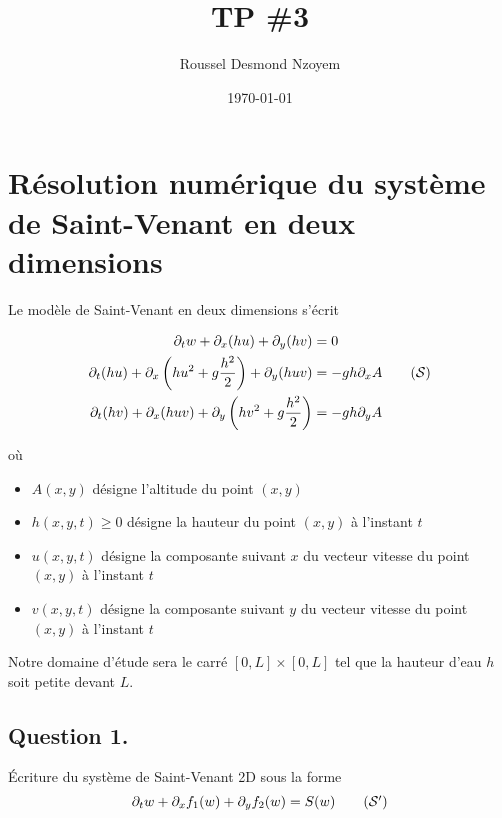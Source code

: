 \documentclass[
	french,
	11pt, %
]{fphw}
\title{TP \#3} %
\author{Roussel Desmond Nzoyem} %
\date{\today} %
\institute{Université de Strasbourg \\ UFR de Mathématiques et Informatique} %
\begin{document}
\maketitle %



\section*{Résolution numérique du système de Saint-Venant en deux dimensions}

Le modèle de Saint-Venant en deux dimensions s'écrit 

\begin{align*}
	\partial_t w + \partial_x (hu) + \partial_y(hv)  &=0 \\
	\partial_t(hu) + \partial_x \left(hu^2 + g\frac{h^2}{2} \right) + \partial_y(huv) &= -gh \partial_x A \tag{$\mathcal{S}$}\\ 
	\partial_t(hv) + \partial_x(huv) + \partial_y \left(hv^2 + g\frac{h^2}{2} \right) &= -gh \partial_y A 
	\label{eq:stVenant2D}
\end{align*}

où 
\begin{itemize}
	\item $A(x,y)$ désigne l’altitude du point $(x,y)$
	\item $h(x,y,t) \geq 0$ désigne la hauteur du point $(x,y)$ à l'instant $t$
	\item $u(x,y,t)$ désigne la composante suivant $x$ du vecteur vitesse du point $(x,y)$ à l'instant $t$
	\item $v(x,y,t)$ désigne la composante suivant $y$ du vecteur vitesse du point $(x,y)$ à l'instant $t$
\end{itemize}


Notre domaine d'étude sera le carré $[0,L]\times[0,L]$ tel que la hauteur d’eau $h$ soit petite devant $L$.


\subsection*{Question 1.}

\begin{problem}
Écriture du système de Saint-Venant 2D sous la forme 
\begin{equation}
	\partial_t w + \partial_x f_1(w) + \partial_y f_2(w) = S(w) \tag{$\mathcal{S}'$}	
\end{equation}
\end{problem}
\end{document}
